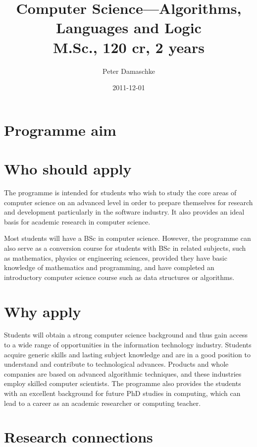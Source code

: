 \documentclass[twocolumn]{article}
\begin{document}
\title{Computer Science---Algorithms, Languages and Logic\\
M.Sc., 120 cr, 2 years}
\author{Peter Damaschke}
\date{2011-12-01}
\maketitle

\section{Programme aim}



\section{Who should apply}

The programme is intended for students who wish to study the core
areas of computer science on an advanced level in order to prepare
themselves for research and development particularly in the software
industry. It also provides an ideal basis for academic research in
computer science.

Most students will have a BSc in computer science. However, the
programme can also serve as a conversion course for students with BSc
in related subjects, such as mathematics, physics or engineering
sciences, provided they have basic knowledge of mathematics and
programming, and have completed an introductory computer science
course such as data structures or algorithms.

\section{Why apply}

Students will obtain a strong computer science background and thus
gain access to a wide range of opportunities in the information
technology industry.  Students acquire generic skills and lasting
subject knowledge and are in a good position to understand and
contribute to technological advances. Products and whole companies are
based on advanced algorithmic techniques, and these industries employ
skilled computer scientists. The programme also provides the students
with an excellent background for future PhD studies in computing,
which can lead to a career as an academic researcher or computing
teacher.

\section{Research connections}
\end{document}
